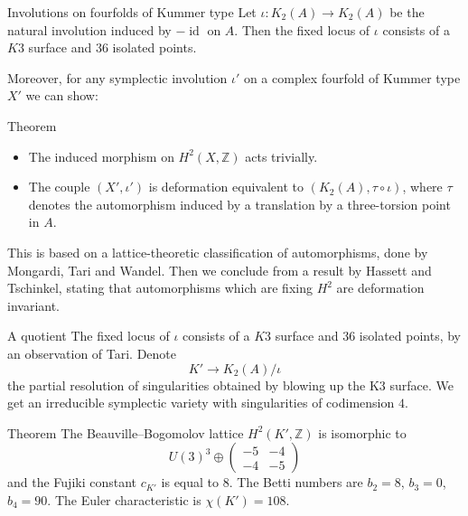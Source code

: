 \documentclass[final]{beamer}
\newlength{\onecolwid}
\DeclareMathOperator{\id}{id}
\newcommand{\Z}{\mathbb{Z}}
\newcommand{\kum}[2]{K_{ #2 }( #1 )}
\newcommand{\X}{\kum{A}{2}}
\begin{document}
\begin{frame}[t]
\begin{columns}[t]
\begin{column}{\onecolwid}
\begin{block}{Involutions on fourfolds of Kummer type}
Let $\iota: \X\rightarrow\X$ be the natural involution induced by $-\id$ on $A$. 
Then the fixed locus of $\iota$ consists of a $K3$ surface and $36$ isolated points. 

Moreover, for any symplectic involution $\iota'$ on a complex fourfold of Kummer type $X'$ we can show:
\begin{alertblock}{Theorem}
\begin{itemize}
 \item The induced morphism on $H^2(X,\Z)$ acts trivially.
 \item The couple $(X',\iota ')$ is deformation equivalent to $(\X,\tau\circ\iota)$, where $\tau$ denotes the automorphism induced by a translation by a three-torsion point in $A$.
\end{itemize}
\end{alertblock}
This is based on a lattice-theoretic classification of automorphisms, done by Mongardi, Tari and Wandel. Then we conclude from a result by Hassett and Tschinkel, stating that automorphisms which are fixing $H^2$ are deformation invariant.
\end{block}

\begin{block}{A quotient}
The fixed locus of $\iota$ consists of a $K3$ surface and $36$ isolated points, by an observation of Tari.
Denote 
$$
K' \rightarrow \X/\iota
$$ 
the partial resolution of singularities obtained by blowing up the K3 surface.
We get an irreducible symplectic variety with singularities of codimension $4$.


\begin{alertblock}{Theorem}
The Beauville--Bogomolov lattice $H^2(K',\Z)$ is isomorphic to 
$$U(3)^{3}\oplus\left(
\begin{array}{cc}
-5 & -4\\
-4 & -5 
\end{array} \right)
$$ 
and the Fujiki constant $c_{K'}$ is equal to $8$.
The Betti numbers are $b_2=8$, $b_3=0$, $b_4=90$. The Euler characteristic is $\chi(K') =108$.
\end{alertblock}
\end{block}

\end{column} %


\end{columns}
\end{frame}
\end{document}
